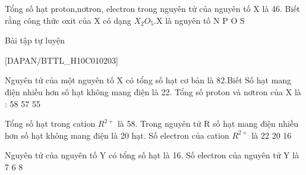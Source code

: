 \begin{vdex}[2]
	Tổng số hạt proton,nơtron, electron trong nguyên tử của nguyên tố X là 46. Biết rằng công thức oxit của X có dạng $ X_{2}O_{5} $.X là nguyên tố
	\choice
	{%
		N
	}
	{%
		\True	P
	}
	{%
		O
	}
	{%
		S
	}
	\huongdan{
	}
\end{vdex}

\begin{bttl}{Bài tập tự luyện}
\end{bttl}
[DAPAN/BTTL_H10C010203]
\setcounter{tcb@cnt@exbox}{0}
\begin{ex}[2]
	Nguyên tử của một nguyên tố X có tổng số hạt cơ  bản là 82.Biết Số hạt mang điện nhiều hơn số hạt không mang điện là 22. Tổng số proton và nơtron của X là :
	\choice
	{%
	58
}
	{%
	57
}
	{%
}
	{%
	55
}

\end{ex}


\begin{ex}[2]
	Tổng số hạt trong cation $ R^{2+} $ là 58. Trong nguyên tử R số hạt mang điện nhiều hơn số hạt không mang điện là 20 hạt. Số electron của cation $ R^{2+} $ là
	\choice
	{%
	}
	{%
		22
	}
	{%
		20
	}
	{%
		16
	}
\end{ex}

\begin{ex}[2]
	Nguyên tử của nguyên tố Y có tổng số hạt là 16. Số electron của nguyên tử Y là
	\choice
	{%
		7
	}
	{%
		6
	}
	{%
	}
	{%
		8
	}
\end{ex}

